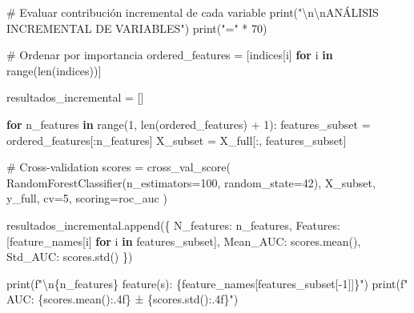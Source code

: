 \documentclass[
  doc,
  floatsintext,
  longtable,
  a4paper,
  nolmodern,
  notxfonts,
  notimes,
  12pt,
  colorlinks=true,linkcolor=blue,citecolor=blue,urlcolor=blue]{apa7}
\newenvironment{Shaded}{\begin{snugshade}}{\end{snugshade}}
\newcommand{\BuiltInTok}[1]{\textcolor[rgb]{0.00,0.23,0.31}{#1}}
\newcommand{\CharTok}[1]{\textcolor[rgb]{0.13,0.47,0.30}{#1}}
\newcommand{\CommentTok}[1]{\textcolor[rgb]{0.37,0.37,0.37}{#1}}
\newcommand{\ControlFlowTok}[1]{\textcolor[rgb]{0.00,0.23,0.31}{\textbf{#1}}}
\newcommand{\DecValTok}[1]{\textcolor[rgb]{0.68,0.00,0.00}{#1}}
\newcommand{\KeywordTok}[1]{\textcolor[rgb]{0.00,0.23,0.31}{\textbf{#1}}}
\newcommand{\NormalTok}[1]{\textcolor[rgb]{0.00,0.23,0.31}{#1}}
\newcommand{\OperatorTok}[1]{\textcolor[rgb]{0.37,0.37,0.37}{#1}}
\newcommand{\SpecialCharTok}[1]{\textcolor[rgb]{0.37,0.37,0.37}{#1}}
\newcommand{\SpecialStringTok}[1]{\textcolor[rgb]{0.13,0.47,0.30}{#1}}
\newcommand{\StringTok}[1]{\textcolor[rgb]{0.13,0.47,0.30}{#1}}
\begin{document}
\begin{Shaded}
\begin{Highlighting}[]
\CommentTok{\# Evaluar contribución incremental de cada variable}
\BuiltInTok{print}\NormalTok{(}\StringTok{"}\CharTok{\textbackslash{}n\textbackslash{}n}\StringTok{ANÁLISIS INCREMENTAL DE VARIABLES"}\NormalTok{)}
\BuiltInTok{print}\NormalTok{(}\StringTok{"="} \OperatorTok{*} \DecValTok{70}\NormalTok{)}

\CommentTok{\# Ordenar por importancia}
\NormalTok{ordered\_features }\OperatorTok{=}\NormalTok{ [indices[i] }\ControlFlowTok{for}\NormalTok{ i }\KeywordTok{in} \BuiltInTok{range}\NormalTok{(}\BuiltInTok{len}\NormalTok{(indices))]}

\NormalTok{resultados\_incremental }\OperatorTok{=}\NormalTok{ []}

\ControlFlowTok{for}\NormalTok{ n\_features }\KeywordTok{in} \BuiltInTok{range}\NormalTok{(}\DecValTok{1}\NormalTok{, }\BuiltInTok{len}\NormalTok{(ordered\_features) }\OperatorTok{+} \DecValTok{1}\NormalTok{):}
\NormalTok{    features\_subset }\OperatorTok{=}\NormalTok{ ordered\_features[:n\_features]}
\NormalTok{    X\_subset }\OperatorTok{=}\NormalTok{ X\_full[:, features\_subset]}
    
    \CommentTok{\# Cross{-}validation}
\NormalTok{    scores }\OperatorTok{=}\NormalTok{ cross\_val\_score(}
\NormalTok{        RandomForestClassifier(n\_estimators}\OperatorTok{=}\DecValTok{100}\NormalTok{, random\_state}\OperatorTok{=}\DecValTok{42}\NormalTok{),}
\NormalTok{        X\_subset, y\_full,}
\NormalTok{        cv}\OperatorTok{=}\DecValTok{5}\NormalTok{,}
\NormalTok{        scoring}\OperatorTok{=}\StringTok{\textquotesingle{}roc\_auc\textquotesingle{}}
\NormalTok{    )}
    
\NormalTok{    resultados\_incremental.append(\{}
        \StringTok{\textquotesingle{}N\_features\textquotesingle{}}\NormalTok{: n\_features,}
        \StringTok{\textquotesingle{}Features\textquotesingle{}}\NormalTok{: [feature\_names[i] }\ControlFlowTok{for}\NormalTok{ i }\KeywordTok{in}\NormalTok{ features\_subset],}
        \StringTok{\textquotesingle{}Mean\_AUC\textquotesingle{}}\NormalTok{: scores.mean(),}
        \StringTok{\textquotesingle{}Std\_AUC\textquotesingle{}}\NormalTok{: scores.std()}
\NormalTok{    \})}
    
    \BuiltInTok{print}\NormalTok{(}\SpecialStringTok{f"}\CharTok{\textbackslash{}n}\SpecialCharTok{\{}\NormalTok{n\_features}\SpecialCharTok{\}}\SpecialStringTok{ feature(s): }\SpecialCharTok{\{}\NormalTok{feature\_names[features\_subset[}\OperatorTok{{-}}\DecValTok{1}\NormalTok{]]}\SpecialCharTok{\}}\SpecialStringTok{"}\NormalTok{)}
    \BuiltInTok{print}\NormalTok{(}\SpecialStringTok{f"  AUC: }\SpecialCharTok{\{}\NormalTok{scores}\SpecialCharTok{.}\NormalTok{mean()}\SpecialCharTok{:.4f\}}\SpecialStringTok{ ± }\SpecialCharTok{\{}\NormalTok{scores}\SpecialCharTok{.}\NormalTok{std()}\SpecialCharTok{:.4f\}}\SpecialStringTok{"}\NormalTok{)}


\end{Highlighting}
\end{Shaded}
\end{document}
